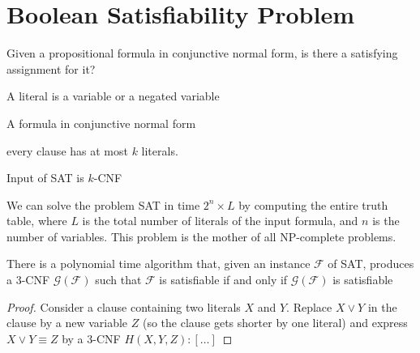 \documentclass[a4paper]{article}
\theoremstyle{plain}
\newtheorem{thm}{Theorem}[section]
\theoremstyle{definition}
\newtheorem{defn}{Definition}[section]
\theoremstyle{remark}
\begin{document}
\section{Boolean Satisfiability Problem}
\begin{tcolorbox}[colback=black!3!white,colframe=black!60!white,title=\begin{defn}Problem SAT \label{Problem SAT}\end{defn}]
Given a propositional formula in conjunctive normal form, is there a satisfying assignment for it?
\end{tcolorbox}
\begin{tcolorbox}[colback=black!3!white,colframe=black!60!white,title=\begin{defn}Literal \label{Literal}\end{defn}]
A literal is a variable or a negated variable
\end{tcolorbox}
\begin{tcolorbox}[colback=black!3!white,colframe=black!60!white,title=\begin{defn}CNF Formula \label{CNF Formula}\end{defn}]
A formula in conjunctive normal form
\end{tcolorbox}
\begin{tcolorbox}[colback=black!3!white,colframe=black!60!white,title=\begin{defn}k-CNF Formula \label{k-CNF Formula}\end{defn}]
every clause has at most $k$ literals.
\end{tcolorbox}
\begin{tcolorbox}[colback=black!3!white,colframe=black!60!white,title=\begin{defn}k-SAT Problem \label{k-SAT Problem}\end{defn}]
Input of SAT is $k$-CNF
\end{tcolorbox}
\begin{tcolorbox}[colback=black!3!white,colframe=black!60!white,title=\begin{thm}Computational Complexity \label{Computational Complexity}\end{thm}]
	We can solve the problem SAT in time $2^{n} \times L$ by computing the entire truth table, where $L$ is the total number of literals of the input formula, and $n$ is the number of variables. This problem is the mother of all NP-complete problems.
\end{tcolorbox}
\begin{tcolorbox}[colback=black!3!white,colframe=black!60!white,title=\begin{thm}Satisfiability Iff \label{Satisfiability Iff}\end{thm}]
	There is a polynomial time algorithm that, given an instance $\mathcal{F}$ of SAT, produces a  $3$-CNF $\mathcal{G(F)}$ such that $\mathcal{F}$ is satisfiable if and only if $\mathcal{G(F)}$ is satisfiable
	\begin{proof}
		Consider a clause containing two literals $X$ and $Y$. Replace $X \lor Y$ in the clause by a new variable $Z$ (so the clause gets shorter by one literal) and express $X \lor Y \equiv Z$ by a $3$-CNF $H(X,Y,Z): [\ldots]$
	\end{proof}
\end{tcolorbox}
\end{document}
